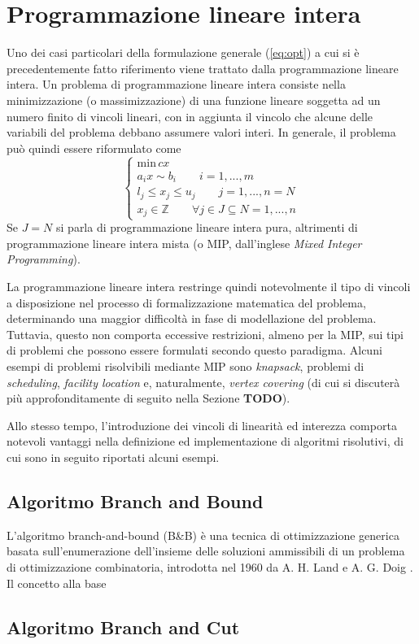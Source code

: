 \section{Programmazione lineare intera}
Uno dei casi particolari della formulazione generale (\ref{eq:opt}) a cui si è precedentemente fatto riferimento viene trattato dalla 
programmazione lineare intera.
Un problema di programmazione lineare intera consiste nella minimizzazione (o massimizzazione) di una funzione lineare soggetta ad un 
numero finito di vincoli lineari, con in aggiunta il vincolo che alcune delle variabili del problema debbano assumere valori interi. 
In generale, il problema può quindi essere riformulato come
\begin{equation}
	\label{eq:linprog}
	\begin{cases}
      \text{min} \, cx\\
      a_i x \sim b_i \qquad i=1,...,m \\
      l_j \leq x_j \leq u_j \qquad j=1,...,n =N \\
      x_j \in \mathbb{Z}  \qquad \forall j \in J \subseteq N = {1,...,n}
    \end{cases}
\end{equation}
Se $J=N$ si parla di programmazione lineare intera pura, altrimenti di programmazione lineare intera mista (o MIP, dall'inglese 
\textit{Mixed Integer Programming}).

La programmazione lineare intera restringe quindi notevolmente il tipo di vincoli a disposizione nel
processo di formalizzazione matematica del problema, determinando una maggior difficoltà in fase di modellazione del problema.
Tuttavia, questo non comporta eccessive restrizioni, almeno per la MIP, sui tipi di problemi che possono essere formulati secondo
questo paradigma. Alcuni esempi di problemi risolvibili mediante MIP sono \textit{knapsack}, problemi di \textit{scheduling}, 
\textit{facility location} e, naturalmente, \textit{vertex covering} (di cui si discuterà più approfonditamente di seguito
nella Sezione \textbf{TODO}).

Allo stesso tempo, l'introduzione dei vincoli di linearità ed interezza comporta notevoli vantaggi nella definizione ed
implementazione di algoritmi risolutivi, di cui sono in seguito riportati alcuni esempi. 

\subsection{Algoritmo Branch and Bound}
L'algoritmo branch-and-bound (B\&B) è una tecnica di ottimizzazione generica basata sull'enumerazione dell'insieme delle soluzioni
ammissibili di un problema di ottimizzazione combinatoria, introdotta nel 1960 da A. H. Land e A. G. Doig \cite{10.2307/1910129}. 
Il concetto alla base

\subsection{Algoritmo Branch and Cut}